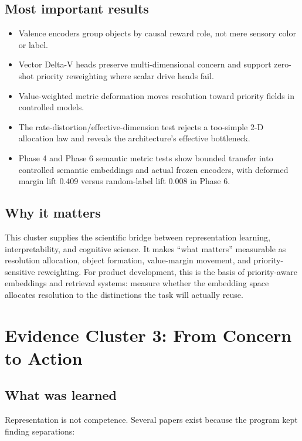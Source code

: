 \documentclass[11pt]{article}
\begin{document}
\subsection{Most important results}

\begin{itemize}
  \item Valence encoders group objects by causal reward role, not mere sensory
  color or label.
  \item Vector Delta-V heads preserve multi-dimensional concern and support
  zero-shot priority reweighting where scalar drive heads fail.
  \item Value-weighted metric deformation moves resolution toward priority
  fields in controlled models.
  \item The rate-distortion/effective-dimension test rejects a too-simple 2-D
  allocation law and reveals the architecture's effective bottleneck.
  \item Phase 4 and Phase 6 semantic metric tests show bounded transfer into
  controlled semantic embeddings and actual frozen encoders, with deformed
  margin lift 0.409 versus random-label lift 0.008 in Phase 6.
\end{itemize}

\subsection{Why it matters}

This cluster supplies the scientific bridge between representation learning,
interpretability, and cognitive science. It makes ``what matters'' measurable
as resolution allocation, object formation, value-margin movement, and
priority-sensitive reweighting. For product development, this is the basis of
priority-aware embeddings and retrieval systems: measure whether the embedding
space allocates resolution to the distinctions the task will actually reuse.

\section{Evidence Cluster 3: From Concern to Action}

\subsection{What was learned}

Representation is not competence. Several papers exist because the program
kept finding separations:
\end{document}
